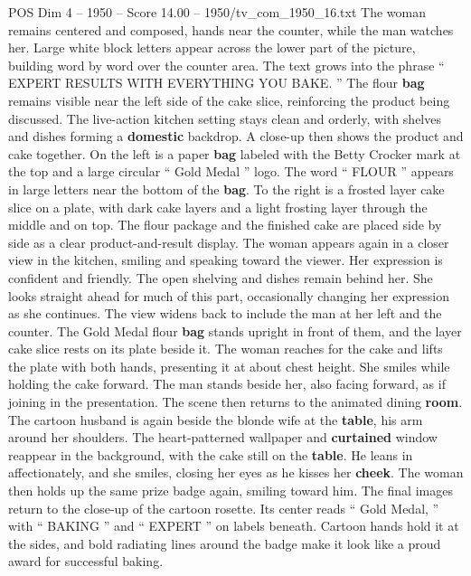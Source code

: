\begin{textsample}{POS Dim 4 – 1950 – Score 14.00 – 1950/tv\_com\_1950\_16.txt}
The woman remains centered and composed, hands near the counter, while the man watches her.
Large white block letters appear across the lower part of the picture, building word by word over the counter area.
The text grows into the phrase “ EXPERT RESULTS WITH EVERYTHING YOU BAKE. ” The flour \textbf{bag} remains visible near the left side of the cake slice, reinforcing the product being discussed.
The live-action kitchen setting stays clean and orderly, with shelves and dishes forming a \textbf{domestic} backdrop.
A close-up then shows the product and cake together.
On the left is a paper \textbf{bag} labeled with the Betty Crocker mark at the top and a large circular “ Gold Medal ” logo.
The word “ FLOUR ” appears in large letters near the bottom of the \textbf{bag}.
To the right is a frosted layer cake slice on a plate, with dark cake layers and a light frosting layer through the middle and on top.
The flour package and the finished cake are placed side by side as a clear product-and-result display.
The woman appears again in a closer view in the kitchen, smiling and speaking toward the viewer.
Her expression is confident and friendly.
The open shelving and dishes remain behind her.
She looks straight ahead for much of this part, occasionally changing her expression as she continues.
The view widens back to include the man at her left and the counter.
The Gold Medal flour \textbf{bag} stands upright in front of them, and the layer cake slice rests on its plate beside it.
The woman reaches for the cake and lifts the plate with both hands, presenting it at about chest height.
She smiles while holding the cake forward.
The man stands beside her, also facing forward, as if joining in the presentation.
The scene then returns to the animated dining \textbf{room}.
The cartoon husband is again beside the blonde wife at the \textbf{table}, his arm around her shoulders.
The heart-patterned wallpaper and \textbf{curtained} window reappear in the background, with the cake still on the \textbf{table}.
He leans in affectionately, and she smiles, closing her eyes as he kisses her \textbf{cheek}.
The woman then holds up the same prize badge again, smiling toward him.
The final images return to the close-up of the cartoon rosette.
Its center reads “ Gold Medal, ” with “ BAKING ” and “ EXPERT ” on labels beneath.
Cartoon hands hold it at the sides, and bold radiating lines around the badge make it look like a proud award for successful baking.

\end{textsample}
